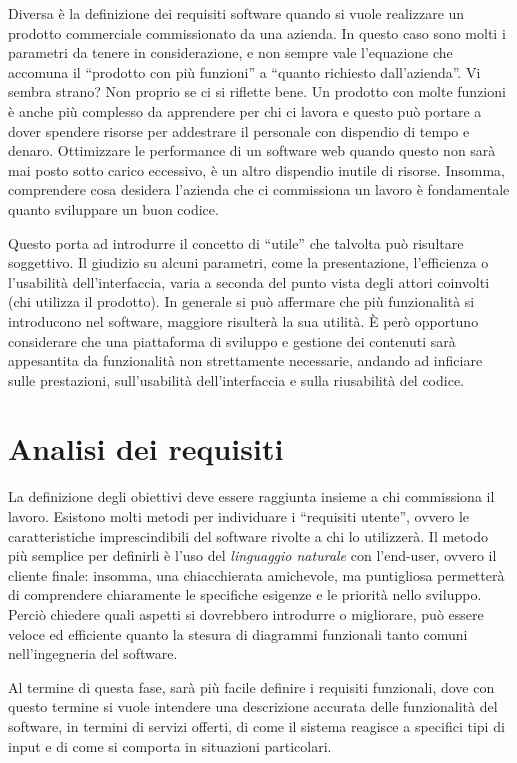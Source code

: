 Diversa è la definizione dei requisiti software quando si vuole realizzare un prodotto commerciale commissionato da una azienda. In questo caso sono molti i parametri da tenere in considerazione, e non sempre vale l'equazione che accomuna il ``prodotto con più funzioni'' a ``quanto richiesto dall'azienda''. Vi sembra strano? Non proprio se ci si riflette bene. Un prodotto con molte funzioni è anche più complesso da apprendere per chi ci lavora e questo può portare a dover spendere risorse per addestrare il personale con dispendio di tempo e denaro. Ottimizzare le performance di un software web quando questo non sarà mai posto sotto carico eccessivo, è un altro dispendio inutile di risorse. Insomma, comprendere cosa desidera l'azienda che ci commissiona un lavoro è fondamentale quanto sviluppare un buon codice.

Questo porta ad introdurre il concetto di ``utile'' che talvolta può risultare soggettivo. Il giudizio su alcuni parametri, come la presentazione, l'efficienza o l'usabilità dell'interfaccia, varia a seconda del punto vista degli attori coinvolti (chi utilizza il prodotto). In generale si può affermare che più funzionalità si introducono nel software, maggiore risulterà la sua utilità. \`E però opportuno considerare che una piattaforma di sviluppo e gestione dei contenuti sarà appesantita da funzionalità non strettamente necessarie, andando ad inficiare sulle prestazioni, sull'usabilità dell'interfaccia e sulla riusabilità del codice.

\section*{Analisi dei requisiti}
La definizione degli obiettivi deve essere raggiunta insieme a chi commissiona il lavoro. Esistono molti metodi per individuare i ``requisiti utente'', ovvero le caratteristiche imprescindibili del software rivolte a chi lo utilizzerà. Il metodo più semplice per definirli è l'uso del \emph{linguaggio naturale} con l'end-user, ovvero il cliente finale: insomma, una chiacchierata amichevole, ma puntigliosa permetterà di comprendere chiaramente le specifiche esigenze e le priorità nello sviluppo. Perciò chiedere quali aspetti si dovrebbero introdurre o migliorare, può essere veloce ed efficiente quanto la stesura di diagrammi funzionali tanto comuni nell'ingegneria del software. 

Al termine di questa fase, sarà più facile definire i requisiti funzionali, dove con questo termine si vuole intendere una descrizione accurata delle funzionalità del software, in termini di servizi offerti, di come il sistema reagisce a specifici tipi di input e di come si comporta in situazioni particolari.

